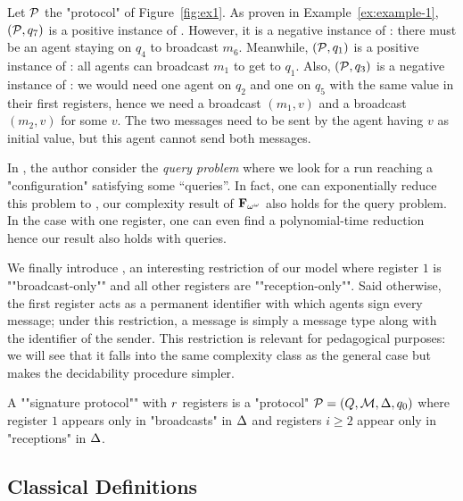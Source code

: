 \begin{example}\label{example-2}
	Let $\mathcal{P}$ the "protocol" of Figure~\ref{fig:ex1}. As proven in Example~\ref{ex:example-1}, $(\mathcal{P},q_7)$ is a positive instance of \COVER. However, it is a negative instance of \TARGET: there must be an agent staying on $q_4$ to broadcast $m_6$. Meanwhile, $(\mathcal{P},q_1)$ is a positive instance of \TARGET: all agents can broadcast $m_1$ to get to $q_1$. Also, $(\mathcal{P}, q_3)$ is a negative instance of \COVER: we would need one agent on $q_2$ and one on $q_5$ with the same value in their first registers, hence we need a broadcast $(m_1,v)$ and a broadcast $(m_2,v)$ for some $v$. The two messages need to be sent by the agent having $v$ as initial value, but this agent cannot send both messages.
\end{example}

\begin{remark}
	In \cite{DelzannoST13}, the author consider the \AP \emph{query problem} where we look for a run reaching a "configuration" satisfying some ``queries''.	
	In fact, one can exponentially reduce this problem to \COVER, our complexity result of $\mathbf{F}_{\omega^\omega}$ also holds for the query problem. In the case with one register, one can even find a polynomial-time reduction hence our \NP result also holds with queries. 
\end{remark}

\AP We finally introduce , an interesting restriction of our model where register $1$ is ""broadcast-only"" and all other registers are ""reception-only"". Said otherwise, the first register acts as a permanent identifier with which agents sign every message; under this restriction, a message is simply a message type along with the identifier of the sender. This restriction is relevant for pedagogical purposes: we will see that it falls into the same complexity class as the general case but makes the decidability procedure simpler. 

\begin{definition}
A ""signature protocol"" with $r$ registers is a "protocol" $\mathcal{P} = (Q, \mathcal{M}, \Delta, q_0)$ where register $1$ appears only in "broadcasts" in $\Delta$ and registers $i \geq 2$ appear only in "receptions" in $\Delta$. 
\end{definition}

\subsection{Classical Definitions}


